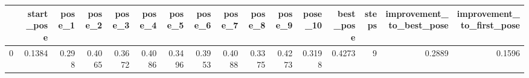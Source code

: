 \begin{tabular}{lrrrrrrrrrrrrrrr}
\toprule
{} &  start\_pose &  pose\_1 &  pose\_2 &  pose\_3 &  pose\_4 &  pose\_5 &  pose\_6 &  pose\_7 &  pose\_8 &  pose\_9 &  pose\_10 &  best\_pose &  steps &  improvement\_to\_best\_pose &  improvement\_to\_first\_pose \\
\midrule
0 &      0.1384 &   0.298 &  0.4065 &  0.3672 &  0.4086 &  0.3496 &  0.3953 &  0.4088 &  0.3375 &  0.4273 &   0.3198 &     0.4273 &      9 &                    0.2889 &                     0.1596 \\
\bottomrule
\end{tabular}
